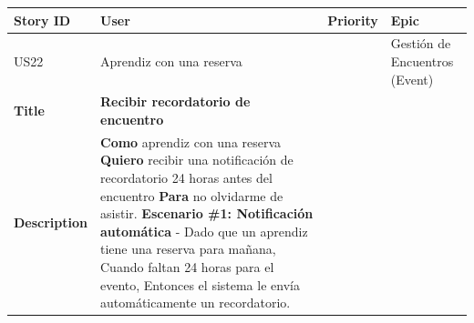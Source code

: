 {\def\LTcaptype{none} %
\begin{longtable}[]{@{}
  >{\raggedright\arraybackslash}p{}
  >{\raggedright\arraybackslash}p{}
  >{\raggedright\arraybackslash}p{}
  >{\raggedright\arraybackslash}p{}@{}}
\toprule\noalign{}
\begin{minipage}[b]{\linewidth}\raggedright
Story ID
\end{minipage} & \begin{minipage}[b]{\linewidth}\raggedright
User
\end{minipage} & \begin{minipage}[b]{\linewidth}\raggedright
Priority
\end{minipage} & \begin{minipage}[b]{\linewidth}\raggedright
Epic
\end{minipage} \\
\midrule\noalign{}
\endhead
\bottomrule\noalign{}
\endlastfoot
US22 & Aprendiz con una reserva & 2 & Gestión de Encuentros (Event) \\
\textbf{Title} & \textbf{Recibir recordatorio de encuentro} & & \\
\textbf{Description} & \textbf{Como} aprendiz con una reserva
\textbf{Quiero} recibir una notificación de recordatorio 24 horas antes
del encuentro \textbf{Para} no olvidarme de asistir. \textbf{Escenario
\#1: Notificación automática} - Dado que un aprendiz tiene una reserva
para mañana, Cuando faltan 24 horas para el evento, Entonces el sistema
le envía automáticamente un recordatorio. & & \\
\end{longtable}
}

